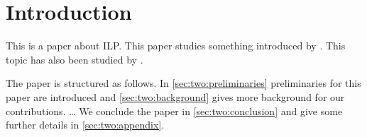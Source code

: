 \section{Introduction}%
\label{sec:two:intro}

This is a paper about \zeroone ILP. This paper studies something introduced by \cite{DBLP:conf/ijcai/AlvianoDR15}. This topic has also been studied by \cite{DBLP:journals/ai/AnsoteguiG17,DBLP:series/faia/BacchusJM21,DBLP:journals/ai/BonetLM07}.

The paper is structured as follows. In \cref{sec:two:preliminaries} preliminaries for this paper are introduced and \cref{sec:two:background} gives more background for our contributions.
\dots
We conclude the paper in \cref{sec:two:conclusion} and give some further details in \cref{sec:two:appendix}.